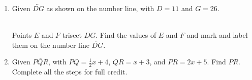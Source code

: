 \documentclass[12pt, twoside]{article}
\begin{document}
\begin{enumerate}
\newpage
\item Given $\overleftrightarrow{DG}$ as shown on the number line, with $D=11$ and $G=26$. \\[15pt]
   \\[10pt]
  Points $E$ and $F$ trisect $\overline{DG}$. Find the values of $E$ and $F$ and mark and label them on the number line $\overleftrightarrow{DG}$. \vspace{6cm}

\item Given $\overline{PQR}$, with $PQ=\frac{1}{2} x+4$, $QR=x+3$, and $PR=2x+5$. Find ${PR}$.\\
  Complete all the steps for full credit. \smallskip
  \vspace{9cm}

\end{enumerate}
\end{document}
